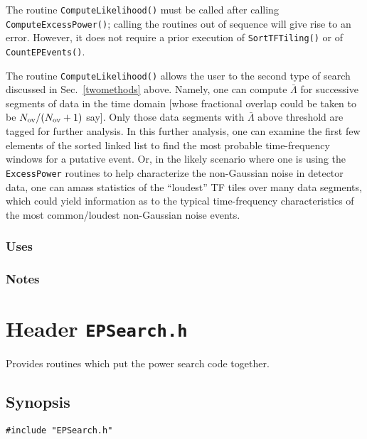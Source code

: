 The routine \verb+ComputeLikelihood()+ must be called after calling
\verb+ComputeExcessPower()+; calling the routines out of sequence will give
rise to an error.  However, it does not require a prior execution of
\verb+SortTFTiling()+ or of \verb+CountEPEvents()+.  

The routine \verb+ComputeLikelihood()+ allows the user to the second type of
search discussed in Sec.\ \ref{twomethods} above.  Namely, one can compute
${\bar \Lambda}$ for successive segments of data in the time domain [whose
fractional overlap could be taken to be $N_{\rm ov} / (N_{\rm ov} +1)$ say].
Only those data segments with ${\bar \Lambda}$ above threshold are tagged for
further analysis.  In this further analysis, one can examine the first few
elements of the sorted linked list to find the most probable time-frequency
windows for a putative event.  Or, in the likely scenario where one is using
the \verb+ExcessPower+ routines to help characterize the non-Gaussian noise in
detector data, one can amass statistics of the ``loudest'' TF tiles over many
data segments, which could yield information as to the typical time-frequency
characteristics of the most common/loudest non-Gaussian noise events.

\subsubsection*{Uses}

\subsubsection*{Notes}

\vfill{\footnotesize}


%
%
%
%
%
%


\newpage
\section{Header \texttt{EPSearch.h}}
\label{s:EPSearch.h}

\noindent Provides routines which put the power search code together.

\subsection*{Synopsis}
\begin{verbatim}
#include "EPSearch.h"
\end{verbatim}

